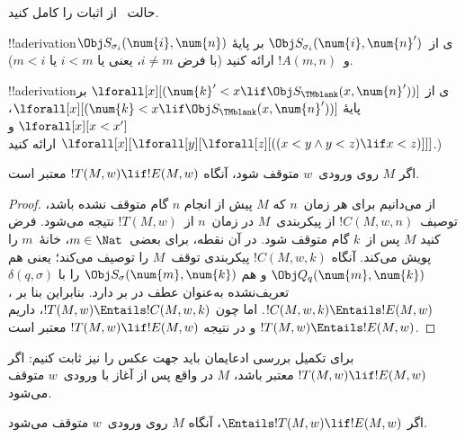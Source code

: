 \documentclass[../../../include/open-logic-section]{subfiles}
\begin{document}
\begin{prob}
حالت~ از اثبات
 را کامل کنید.
\end{prob}

\begin{prob}
!!a{derivation}ی از~$\Obj S_{\sigma_i}(\num{i},\num{n}')$ بر پایهٔ
$\Obj S_{\sigma_i}(\num{i},\num{n})$ و~$!A(m,n)$ ارائه کنید (با فرض
$i\neq m$، یعنی یا $i<m$ یا $m<i$).
\end{prob}

\begin{prob}
!!a{derivation}ی از
$\lforall[x][(\num{k}' < x \lif \Obj S_\TMblank(x, \num{n}'))]$ بر
پایهٔ $\lforall[x][(\num{k} < x \lif \Obj
  S_\TMblank(x, \num{n}'))]$، $\lforall[x][x < x']$ و
$\lforall[x][\lforall[y][\lforall[z][ ((x < y \land y < z) \lif x <
      z)]]]$ ارائه کنید.)
\end{prob}


\begin{lem}
اگر $M$ روی ورودی~$w$ متوقف شود، آنگاه $!T(M,w)\lif !E(M,w)$ معتبر
است.
\end{lem}

\begin{proof}
از  می‌دانیم برای هر زمان~$n$ که $M$ پیش از انجام
$n$ گام متوقف نشده باشد، توصیف~$!C(M,w,n)$ از پیکربندی~$M$ در
زمان~$n$ از~$!T(M,w)$ نتیجه می‌شود. فرض کنید $M$
پس از~$k$ گام متوقف شود. در آن نقطه، برای بعضی~$m\in\Nat$، خانهٔ~$m$
را پویش می‌کند. آنگاه $!C(M,w,k)$ پیکربندی توقف~$M$ را توصیف می‌کند؛
یعنی هم $\Obj Q_q(\num{m},\num{k})$ و هم
$\Obj S_\sigma(\num{m},\num{k})$ را با $\delta(q,\sigma)$ تعریف‌نشده
به‌عنوان عطف در بر دارد. بنابراین بنا بر
،
$!C(M,w,k)\Entails !E(M,w)$. اما چون
$!T(M,w)\Entails !C(M,w,k)$، داریم
$!T(M,w)\Entails !E(M,w)$ و در نتیجه
$!T(M,w)\lif !E(M,w)$ معتبر است.
\end{proof}


\begin{explain}
برای تکمیل بررسی ادعایمان باید جهت عکس را نیز ثابت کنیم: اگر
$!T(M,w)\lif !E(M,w)$ معتبر باشد، $M$ در واقع پس از آغاز با ورودی~$w$
متوقف می‌شود.
\end{explain}

\begin{lem}
اگر $\Entails !T(M,w)\lif !E(M,w)$، آنگاه $M$ روی ورودی~$w$ متوقف
می‌شود.
\end{lem}
\end{document}
